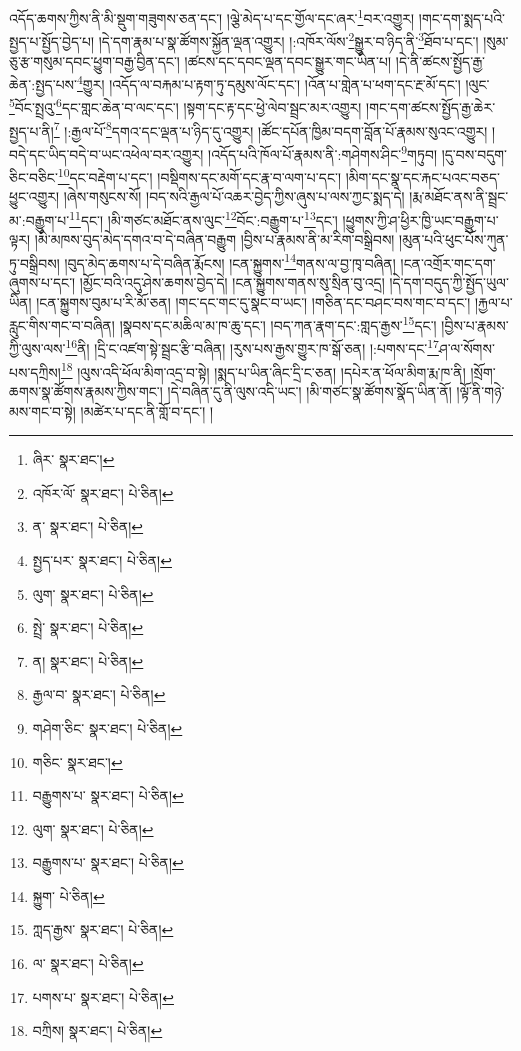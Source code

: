 འདོད་ཆགས་ཀྱིས་ནི་མི་སྡུག་གཟུགས་ཅན་དང་། །ལྕེ་མེད་པ་དང་གྱོལ་དང་ཞར་\footnote{ཞིར་  སྣར་ཐང་། }བར་འགྱུར། །གང་དག་སྨད་པའི་སྤྱད་པ་སྤྱོད་བྱེད་པ། །དེ་དག་རྣམ་པ་སྣ་ཚོགས་སྐྱོན་ལྡན་འགྱུར། །:འཁོར་ལོས་\footnote{འཁོར་ལོ་  སྣར་ཐང་།  པེ་ཅིན། }སྒྱུར་བ་ཉིད་ནི་\footnote{ན་  སྣར་ཐང་།  པེ་ཅིན། }ཐོབ་པ་དང་། །སུམ་ཅུ་རྩ་གསུམ་དབང་ཕྱུག་བརྒྱ་བྱིན་དང་། །ཚངས་དང་དབང་ལྡན་དབང་སྒྱུར་གང་ཡིན་པ། །དེ་ནི་ཚངས་སྤྱོད་རྒྱ་ཆེན་:སྤྱད་པས་\footnote{སྤྱད་པར་  སྣར་ཐང་།  པེ་ཅིན། }གྱུར། །འདོད་ལ་བརྐམ་པ་རྟག་ཏུ་དམུས་ལོང་དང་། །འོན་པ་གླེན་པ་ཕག་དང་རྔ་མོ་དང་། །ལུང་\footnote{ལུག་  སྣར་ཐང་།  པེ་ཅིན། }བོང་སྤྲའུ་\footnote{སྤྲེ་  སྣར་ཐང་།  པེ་ཅིན། }དང་གླང་ཆེན་བ་ལང་དང་། །སྟག་དང་རྟ་དང་ཕྱེ་ལེབ་སྦྲང་མར་འགྱུར། །གང་དག་ཚངས་སྤྱོད་རྒྱ་ཆེར་སྤྱད་པ་ནི།\footnote{ན།  སྣར་ཐང་།  པེ་ཅིན། } །:རྒྱལ་པོ་\footnote{རྒྱལ་བ་  སྣར་ཐང་།  པེ་ཅིན། }དགའ་དང་ལྡན་པ་ཉིད་དུ་འགྱུར། །ཚོང་དཔོན་ཁྱིམ་བདག་བློན་པོ་རྣམས་སུའང་འགྱུར། །བདེ་དང་ཡིད་བདེ་བ་ཡང་འཕེལ་བར་འགྱུར། །འདོད་པའི་ཁོལ་པོ་རྣམས་ནི་:གཤེགས་ཤིང་\footnote{གཤེག་ཅིང་  སྣར་ཐང་།  པེ་ཅིན། }གཏུབ། །དུ་བས་བདུག་ཅིང་བཅིང་\footnote{གཅིང་  སྣར་ཐང་། }དང་བརྡེག་པ་དང་། །བསྡིགས་དང་མགོ་དང་རྣ་བ་ལག་པ་དང་། །མིག་དང་སྣ་དང་རྐང་པའང་བཅད་ཕྱུང་འགྱུར། །ཞེས་གསུངས་སོ། །བད་སའི་རྒྱལ་པོ་འཆར་བྱེད་ཀྱིས་ཞུས་པ་ལས་ཀྱང་སྨད་དེ། །རྨ་མཐོང་ནས་ནི་སྦྲང་མ་:བརྒྱུག་པ་\footnote{བརྒྱུགས་པ་  སྣར་ཐང་།  པེ་ཅིན། }དང་། །མི་གཙང་མཐོང་ནས་ལུང་\footnote{ལུག་  སྣར་ཐང་།  པེ་ཅིན། }བོང་:བརྒྱུག་པ་\footnote{བརྒྱུགས་པ་  སྣར་ཐང་།  པེ་ཅིན། }དང་། །ཕྱུགས་ཀྱི་ཤ་ཕྱིར་ཁྱི་ཡང་བརྒྱུག་པ་ལྟར། །མི་མཁས་བུད་མེད་དགའ་བ་དེ་བཞིན་བརྒྱུག །བྱིས་པ་རྣམས་ནི་མ་རིག་བསྒྲིབས། །མུན་པའི་ཕུང་པོས་ཀུན་ཏུ་བསྒྲིབས། །བུད་མེད་ཆགས་པ་དེ་བཞིན་རྨོངས། །ངན་སྐྱུགས་\footnote{སྐྱུག་  པེ་ཅིན། }གནས་ལ་བྱ་ཁྭ་བཞིན། །ངན་འགྲོར་གང་དག་ཞུགས་པ་དང་། །མྱོང་བའི་འདུ་ཤེས་ཆགས་བྱེད་དེ། །ངན་སྐྱུགས་གནས་སུ་སྲིན་བུ་འདྲ། །དེ་དག་བདུད་ཀྱི་སྤྱོད་ཡུལ་ཡིན། །ངན་སྐྱུགས་བུམ་པ་རི་མོ་ཅན། །གང་དང་གང་དུ་སྣང་བ་ཡང་། །གཅིན་དང་བཤང་བས་གང་བ་དང་། །རྐྱལ་པ་རླུང་གིས་གང་བ་བཞིན། །སྣབས་དང་མཆིལ་མ་ཁ་ཆུ་དང་། །བད་ཀན་རྣག་དང་:གླད་རྒྱས་\footnote{ཀླད་རྒྱས་  སྣར་ཐང་།  པེ་ཅིན། }དང་། །བྱིས་པ་རྣམས་ཀྱི་ལུས་ལས་\footnote{ལ་  སྣར་ཐང་།  པེ་ཅིན། }ནི། །དྲི་ང་འཛག་སྟེ་སྦྲང་རྩི་བཞིན། །རུས་པས་རྒྱས་གྱུར་ཁ་སྒོ་ཅན། །:པགས་དང་\footnote{པགས་པ་  སྣར་ཐང་།  པེ་ཅིན། }ཤ་ལ་སོགས་པས་དཀྲིས།\footnote{བཀྲིས།  སྣར་ཐང་།  པེ་ཅིན། } །ལུས་འདི་ཕོལ་མིག་འདྲ་བ་སྟེ། །སྨད་པ་ཡིན་ཞིང་དྲི་ང་ཅན། །དཔེར་ན་ཕོལ་མིག་རྨ་ཁ་ནི། །སྲོག་ཆགས་སྣ་ཚོགས་རྣམས་ཀྱིས་གང་། །དེ་བཞིན་དུ་ནི་ལུས་འདི་ཡང་། །མི་གཙང་སྣ་ཚོགས་སྣོད་ཡིན་ནོ། །ལྟོ་ནི་གཉེ་མས་གང་བ་སྟེ། །མཚེར་པ་དང་ནི་གློ་བ་དང་། །
